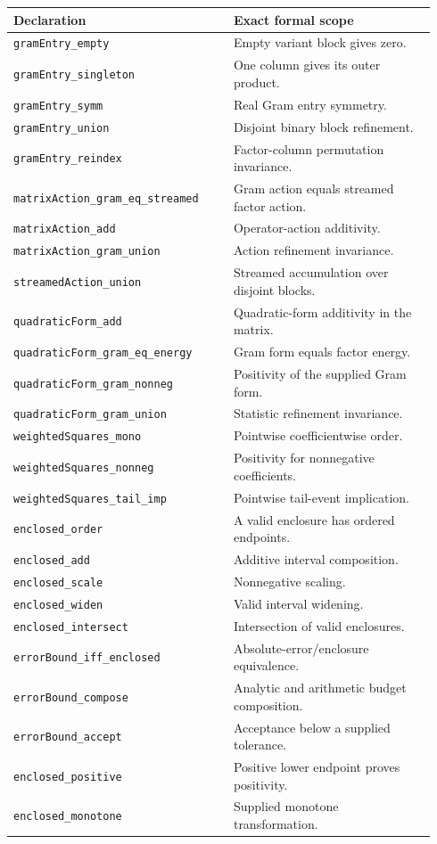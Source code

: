 \documentclass[11pt]{article}
\newcommand{\decl}[1]{\nolinkurl{#1}}
\begin{document}
{\small
\begin{longtable}{@{}p{0.49\linewidth}p{0.45\linewidth}@{}}
\toprule Declaration & Exact formal scope\\\midrule\endhead
\decl{gramEntry_empty} & Empty variant block gives zero.\\
\decl{gramEntry_singleton} & One column gives its outer product.\\
\decl{gramEntry_symm} & Real Gram entry symmetry.\\
\decl{gramEntry_union} & Disjoint binary block refinement.\\
\decl{gramEntry_reindex} & Factor-column permutation invariance.\\
\decl{matrixAction_gram_eq_streamed} & Gram action equals streamed factor action.\\
\decl{matrixAction_add} & Operator-action additivity.\\
\decl{matrixAction_gram_union} & Action refinement invariance.\\
\decl{streamedAction_union} & Streamed accumulation over disjoint blocks.\\
\decl{quadraticForm_add} & Quadratic-form additivity in the matrix.\\
\decl{quadraticForm_gram_eq_energy} & Gram form equals factor energy.\\
\decl{quadraticForm_gram_nonneg} & Positivity of the supplied Gram form.\\
\decl{quadraticForm_gram_union} & Statistic refinement invariance.\\
\decl{weightedSquares_mono} & Pointwise coefficientwise order.\\
\decl{weightedSquares_nonneg} & Positivity for nonnegative coefficients.\\
\decl{weightedSquares_tail_imp} & Pointwise tail-event implication.\\
\decl{enclosed_order} & A valid enclosure has ordered endpoints.\\
\decl{enclosed_add} & Additive interval composition.\\
\decl{enclosed_scale} & Nonnegative scaling.\\
\decl{enclosed_widen} & Valid interval widening.\\
\decl{enclosed_intersect} & Intersection of valid enclosures.\\
\decl{errorBound_iff_enclosed} & Absolute-error/enclosure equivalence.\\
\decl{errorBound_compose} & Analytic and arithmetic budget composition.\\
\decl{errorBound_accept} & Acceptance below a supplied tolerance.\\
\decl{enclosed_positive} & Positive lower endpoint proves positivity.\\
\decl{enclosed_monotone} & Supplied monotone transformation.\\
\bottomrule
\end{longtable}
}
\end{document}
